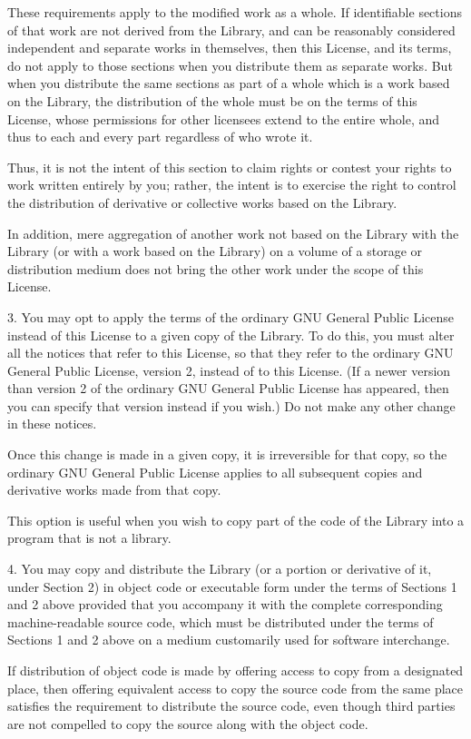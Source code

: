 \documentclass[twoside]{tceusermanual}
\begin{document}
These requirements apply to the modified work as a whole.  If
identifiable sections of that work are not derived from the
Library, and can be reasonably considered independent and
separate works in themselves, then this License, and its terms,
do not apply to those sections when you distribute them as
separate works.  But when you distribute the same sections as
part of a whole which is a work based on the Library, the
distribution of the whole must be on the terms of this License,
whose permissions for other licensees extend to the entire
whole, and thus to each and every part regardless of who wrote
it.

Thus, it is not the intent of this section to claim rights or
contest your rights to work written entirely by you; rather, the
intent is to exercise the right to control the distribution of
derivative or collective works based on the Library.

In addition, mere aggregation of another work not based on the
Library with the Library (or with a work based on the Library)
on a volume of a storage or distribution medium does not bring
the other work under the scope of this License.

3. You may opt to apply the terms of the ordinary GNU General
Public License instead of this License to a given copy of the
Library.  To do this, you must alter all the notices that refer
to this License, so that they refer to the ordinary GNU General
Public License, version 2, instead of to this License.  (If a
newer version than version 2 of the ordinary GNU General Public
License has appeared, then you can specify that version instead
if you wish.)  Do not make any other change in these notices.
 
Once this change is made in a given copy, it is irreversible for
that copy, so the ordinary GNU General Public License applies to
all subsequent copies and derivative works made from that copy.

This option is useful when you wish to copy part of the code of
the Library into a program that is not a library.

4. You may copy and distribute the Library (or a portion or
derivative of it, under Section 2) in object code or executable
form under the terms of Sections 1 and 2 above provided that you
accompany it with the complete corresponding machine-readable
source code, which must be distributed under the terms of
Sections 1 and 2 above on a medium customarily used for software
interchange.

If distribution of object code is made by offering access to
copy from a designated place, then offering equivalent access to
copy the source code from the same place satisfies the
requirement to distribute the source code, even though third
parties are not compelled to copy the source along with the
object code.
\end{document}
